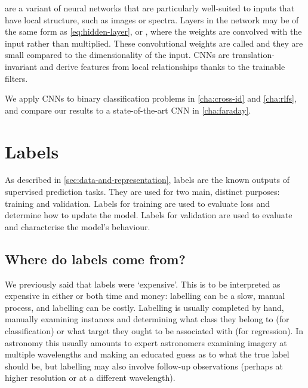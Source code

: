          \citep[CNN;][]{lecun98} are a variant of neural networks that are particularly well-suited to inputs that have local structure, such as images or spectra. Layers in the network may be  of the same form as \autoref{eq:hidden-layer}, or , where the weights are convolved with the input rather than multiplied. These convolutional weights are called  and they are small compared to the dimensionality of the input. CNNs are translation-invariant \citep{waibel_phoneme_1989} and derive features from local relationships thanks to the trainable filters.

        We apply CNNs to binary classification problems in \autoref{cha:cross-id} and \autoref{cha:rlfs}, and compare our results to a state-of-the-art CNN in \autoref{cha:faraday}.

\section{Labels}
\label{sec:labels}
    
    As described in \autoref{sec:data-and-representation}, labels are the known outputs of supervised prediction tasks. They are used for two main, distinct purposes: training and validation. Labels for training are used to evaluate loss and determine how to update the model. Labels for validation are used to evaluate and characterise the model's behaviour.

    \subsection{Where do labels come from?}
    \label{sec:sources-of-labels}

        We previously said that labels were `expensive'. This is to be interpreted as expensive in either or both time and money: labelling can be a slow, manual process, and labelling can be costly. Labelling is usually completed by hand, manually examining instances and determining what class they belong to (for classification) or what target they ought to be associated with (for regression). In astronomy this usually amounts to expert astronomers examining imagery at multiple wavelengths and making an educated guess as to what the true label should be, but labelling may also involve follow-up observations (perhaps at higher resolution or at a different wavelength).


